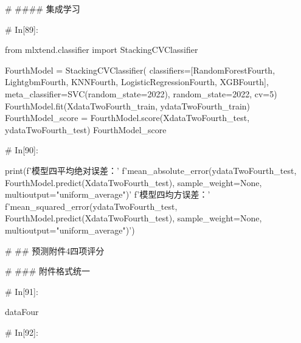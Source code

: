 \documentclass{MathorCupmodeling}
\begin{document}
\begin{python}
	# #### 集成学习
	
	# In[89]:
	
	
	from mlxtend.classifier import StackingCVClassifier
	
	FourthModel = StackingCVClassifier(
		classifiers=[RandomForestFourth, LightgbmFourth, KNNFourth, LogisticRegressionFourth, XGBFourth],
		meta_classifier=SVC(random_state=2022), random_state=2022, cv=5)
	FourthModel.fit(XdataTwoFourth_train, ydataTwoFourth_train)
	FourthModel_score = FourthModel.score(XdataTwoFourth_test, ydataTwoFourth_test)
	FourthModel_score
	
	# In[90]:
	
	
	print(f'模型四平均绝对误差：'
		  f'{mean_absolute_error(ydataTwoFourth_test, FourthModel.predict(XdataTwoFourth_test), sample_weight=None, multioutput="uniform_average")}\n'
		  f'模型四均方误差：'
		  f'{mean_squared_error(ydataTwoFourth_test, FourthModel.predict(XdataTwoFourth_test), sample_weight=None, multioutput="uniform_average")}')
	
	# ## 预测附件4四项评分
	
	# ### 附件格式统一
	
	# In[91]:
	
	
	dataFour
	
	# In[92]:
	

\end{python}
\end{document}
